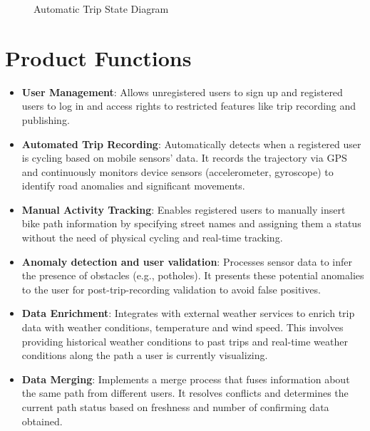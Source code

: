 \begin{figure}[H]
    \centering
    
    \caption{Automatic Trip State Diagram}
    \label{fig:automatic_trip_state}
\end{figure}


\section{Product Functions}
\label{sec:functions}

\begin{itemize}
    \item \textbf{User Management}: Allows unregistered users to sign up and registered users to log in and access rights to restricted features like trip recording and publishing.

    \item \textbf{Automated Trip Recording}: Automatically detects when a registered user is cycling based on mobile sensors' data. It records the trajectory via GPS and continuously monitors device sensors (accelerometer, gyroscope) to identify road anomalies and significant movements.

    \item \textbf{Manual Activity Tracking}: Enables registered users to manually insert bike path information by specifying street names and assigning them a status without the need of physical cycling and real-time tracking.

    \item \textbf{Anomaly detection and user validation}: Processes sensor data to infer the presence of obstacles (e.g., potholes). It presents these potential anomalies to the user for post-trip-recording validation to avoid false positives.

    \item \textbf{Data Enrichment}: Integrates with external weather services to enrich trip data with weather conditions, temperature and wind speed. This involves providing historical weather conditions to past trips and real-time weather conditions along the path a user is currently visualizing.

    \item \textbf{Data Merging}: Implements a merge process that fuses information about the same path from different users. It resolves conflicts and determines the current path status based on freshness and number of confirming data obtained.


\end{itemize}
